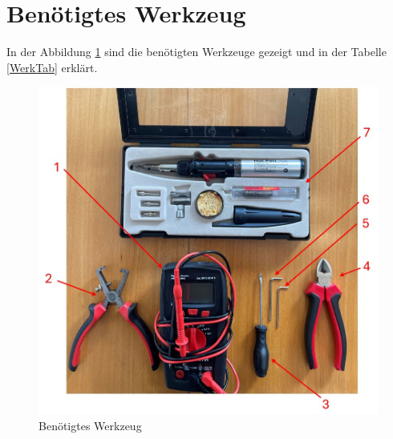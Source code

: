 \section{Benötigtes Werkzeug}
In der Abbildung \ref{Benwerk} sind die benötigten Werkzeuge gezeigt und in der Tabelle \ref{WerkTab} erklärt. 

\begin{figure}[H]
	\begin{center}
		\includegraphics[width=\textwidth]{Images/BenWerk.jpg}
		\caption{Benötigtes Werkzeug} \label{Benwerk}
	\end{center}
\end{figure}

